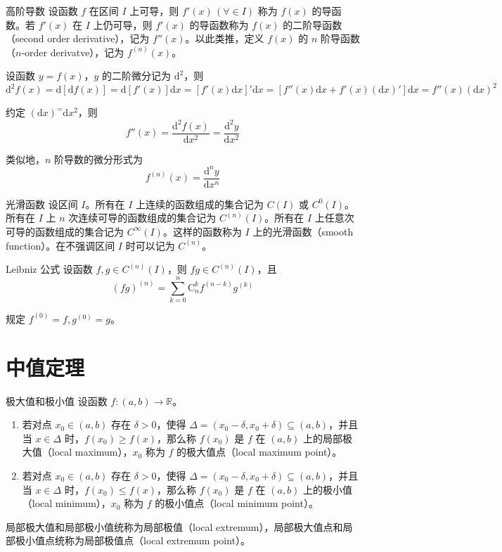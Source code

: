 \begin{definition}{高阶导数}
    设函数 $f$ 在区间 $I$ 上可导，则 $f'(x)\,(\forall \in I)$ 称为 $f(x)$ 的导函数。若 $f'(x)$ 在 $I$ 上仍可导，则 $f'(x)$ 的导函数称为 $f(x)$ 的二阶导函数（second order derivative），记为 $f''(x)$。以此类推，定义 $f(x)$ 的 $n$ 阶导函数（$n$-order derivatve），记为 $f^{(n)}(x)$。
\end{definition}

设函数 $y = f(x)$，$y$ 的二阶微分记为 $\mathrm{d}^2$，则
\[\mathrm{d}^2f(x) = \mathrm{d}[\mathrm{d}f(x)] = \mathrm{d}[f'(x)]\mathrm{d}x = [f'(x)\mathrm{d}x]'\mathrm{d}x = [f''(x)\mathrm{d}x + f'(x)(\mathrm{d}x)']\mathrm{d}x = f''(x)(\mathrm{d}x)^2\]

约定 $(\mathrm{d}x)^ = \mathrm{d}x^2$，则
\[f''(x) = \frac{\mathrm{d}^{2}f(x)}{\mathrm{d}x^2} = \frac{\mathrm{d}^{2}y}{\mathrm{d}x^2}\]

类似地，$n$ 阶导数的微分形式为
\[f^{(n)}(x) = \frac{\mathrm{d}^{n}y}{\mathrm{d}x^n}\]

\begin{definition}{光滑函数}
    设区间 $I$。所有在 $I$ 上连续的函数组成的集合记为 $C(I)$ 或 $C^0(I)$。所有在 $I$ 上 $n$ 次连续可导的函数组成的集合记为 $C^{(n)}(I)$。所有在 $I$ 上任意次可导的函数组成的集合记为 $C^\infty(I)$。这样的函数称为 $I$ 上的光滑函数（smooth function）。在不强调区间 $I$ 时可以记为 $C^{(n)}$。
\end{definition}

\begin{theorem}{Leibniz 公式}
    设函数 $f, g \in C^{(n)}(I)$，则 $fg \in C^{(n)}(I)$，且
    \[(fg)^{(n)} = \sum_{k = 0}^{n} \mathrm{C}_{n}^{k}f^{(n - k)}g^{(k)} \]

    规定 $f^{(0)} = f, g^{(0)} = g$。
\end{theorem}

\section{中值定理}

\begin{definition}{极大值和极小值}
    设函数 $f:(a,b)\to \mathbb{R}$。
    \begin{enumerate}
        \item 若对点 $x_0 \in (a,b)$ 存在 $\delta > 0$，使得 $\Delta = (x_0 - \delta,x_0 + \delta) \subseteq (a,b)$，并且当 $x \in \Delta$ 时，$f(x_0)\geqslant f(x)$，那么称 $f(x_0)$ 是 $f$ 在 $(a,b)$ 上的局部极大值（local maximum），$x_0$ 称为 $f$ 的极大值点（local maximum point）。
        \item 若对点 $x_0 \in (a,b)$ 存在 $\delta > 0$，使得 $\Delta = (x_0 - \delta,x_0 + \delta) \subseteq (a,b)$，并且当 $x \in \Delta$ 时，$f(x_0)\leqslant f(x)$，那么称 $f(x_0)$ 是 $f$ 在 $(a,b)$ 上的极小值（local minimum），$x_0$ 称为 $f$ 的极小值点（local minimum point）。
    \end{enumerate}
    局部极大值和局部极小值统称为局部极值（local extremum），局部极大值点和局部极小值点统称为局部极值点（local extremum point）。
\end{definition}


